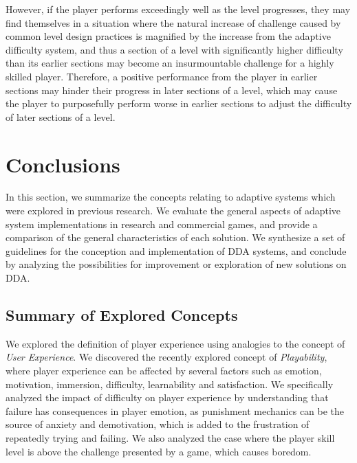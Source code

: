 However, if the player performs exceedingly well as the level progresses, they may find themselves in a situation where the natural increase of challenge caused by common level design practices is magnified by the increase from the adaptive difficulty system, and thus a section of a level with significantly higher difficulty than its earlier sections may become an insurmountable challenge for a highly skilled player. Therefore, a positive performance from the player in earlier sections may hinder their progress in later sections of a level, which may cause the player to purposefully perform worse in earlier sections to adjust the difficulty of later sections of a level.

\section{Conclusions}

In this section, we summarize the concepts relating to adaptive systems which were explored in previous research. We evaluate the general aspects of adaptive system implementations in research and commercial games, and provide a comparison of the general characteristics of each solution. We synthesize a set of guidelines for the conception and implementation of DDA systems, and conclude by analyzing the possibilities for improvement or exploration of new solutions on DDA. 

\subsection{Summary of Explored Concepts}

We explored the definition of player experience using analogies to the concept of \emph{User Experience}. We discovered the recently explored concept of \emph{Playability}, where player experience can be affected by several factors such as emotion, motivation, immersion, difficulty, learnability and satisfaction. We specifically analyzed the impact of difficulty on player experience by understanding that failure has consequences in player emotion, as punishment mechanics can be the source of anxiety and demotivation, which is added to the frustration of repeatedly trying and failing. We also analyzed the case where the player skill level is above the challenge presented by a game, which causes boredom.


